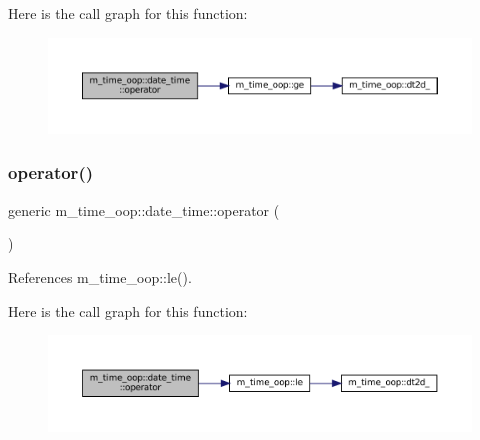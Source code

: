 Here is the call graph for this function\+:\nopagebreak
\begin{figure}[H]
\begin{center}
\leavevmode
\includegraphics[width=350pt]{structm__time__oop_1_1date__time_a4c84e88433b8d8bde7671ea0c71cea1f_cgraph}
\end{center}
\end{figure}
\mbox{\label{structm__time__oop_1_1date__time_ae2bdcddfab20c4859d6d36ff30b5b778}} 
\subsubsection{\texorpdfstring{operator()}{operator()}\hspace{0.1cm}{\footnotesize\ttfamily [6/9]}}
{\footnotesize\ttfamily generic m\+\_\+time\+\_\+oop\+::date\+\_\+time\+::operator (\begin{DoxyParamCaption}{ }\end{DoxyParamCaption})\hspace{0.3cm}{\ttfamily [private]}}



References m\+\_\+time\+\_\+oop\+::le().

Here is the call graph for this function\+:\nopagebreak
\begin{figure}[H]
\begin{center}
\leavevmode
\includegraphics[width=350pt]{structm__time__oop_1_1date__time_ae2bdcddfab20c4859d6d36ff30b5b778_cgraph}
\end{center}
\end{figure}
\mbox{\label{structm__time__oop_1_1date__time_ab7cce18fa0856dab47620629af1eda32}} 
